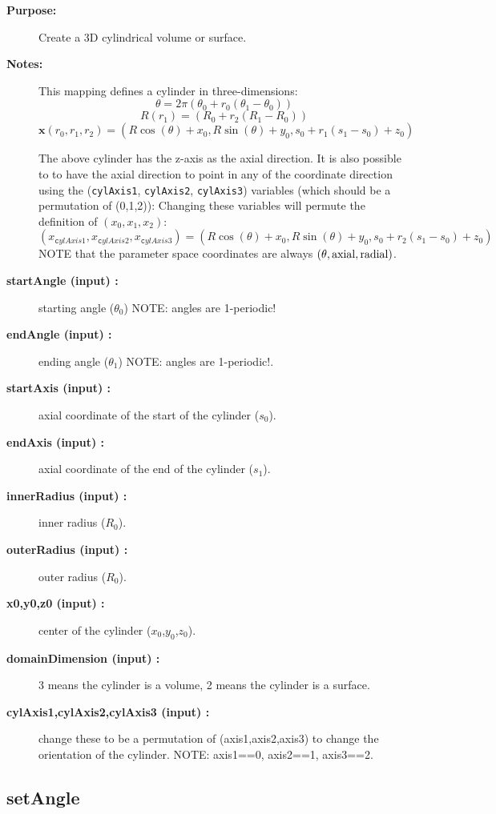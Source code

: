 \begin{description}
\item[{\bf Purpose:}]  Create a 3D cylindrical volume or surface. 
\item[{\bf Notes:}] 
 This mapping defines a cylinder in three-dimensions:
 \[ \theta =  2\pi( \theta_0 + r_0( \theta_1-\theta_0) ) \]
 \[ R(r_1) = (R_0 + r_2 (R_1-R_0))  \]
 \[ {\mathbf x}(r_0,r_1,r_2) = ( R \cos(\theta ) + x_0 , R\sin(\theta) + y_0 , s_0 + r_1(s_1-s_0) + z_0 ) \]

 The above cylinder has the z-axis as the axial direction. It is also possible to to have the
 axial direction to point in any of the coordinate direction using the 
 ({\tt cylAxis1}, {\tt cylAxis2}, {\tt cylAxis3}) variables (which should be a permutation of (0,1,2)):
  Changing these variables will permute the definition of $(x_0,x_1,x_2)$: 
 \[
    (x_{\mathtt cylAxis1},x_{\mathtt cylAxis2},x_{\mathtt cylAxis3}) = ( R \cos(\theta ) 
    + x_0 , R\sin(\theta) + y_0 , s_0 + r_2(s_1-s_0) + z_0 )
 \]
 NOTE that the parameter space coordinates are always $(\theta,\rm{axial},\rm{radial})$. 

\item[{\bf startAngle (input) :}]  starting angle ($\theta_0$) NOTE: angles are 1-periodic!
\item[{\bf endAngle (input) :}]   ending angle ($\theta_1$) NOTE: angles are 1-periodic!.
\item[{\bf startAxis (input) :}]  axial coordinate of the start of the cylinder ($s_0$).
\item[{\bf endAxis (input) :}]   axial coordinate of the end of the cylinder ($s_1$).
\item[{\bf innerRadius (input) :}]  inner radius ($R_0$).
\item[{\bf outerRadius (input) :}]  outer radius ($R_0$).
\item[{\bf x0,y0,z0 (input) :}]  center of the cylinder ($x_0$,$y_0$,$z_0$).
\item[{\bf domainDimension (input) :}]  3 means the cylinder is a volume, 2 means the cylinder is a surface.
\item[{\bf cylAxis1,cylAxis2,cylAxis3 (input) :}]  change these to be a permutation of (axis1,axis2,axis3) to change
   the orientation of the cylinder. NOTE: axis1==0, axis2==1, axis3==2.
\end{description}
\subsection{setAngle}
 
